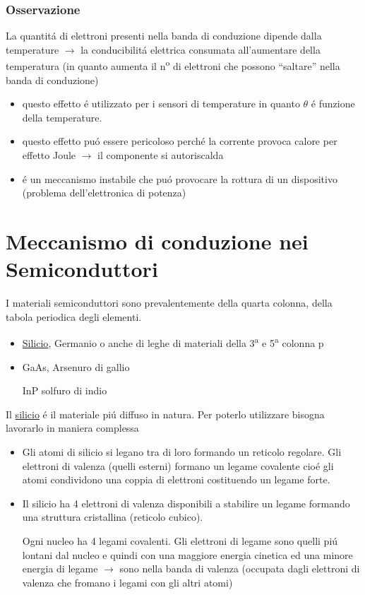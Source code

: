 \documentclass{article}
\begin{document}
\subsubsection{Osservazione}
La quantit\'a di elettroni presenti nella banda di conduzione dipende dalla temperature $\rightarrow$ la conducibilit\'a elettrica consumata all'aumentare della temperatura (in quanto aumenta il n\textsuperscript{o} di elettroni che possono ``saltare'' nella banda di conduzione)
\begin{itemize}
    \item questo effetto \'e utilizzato per i sensori di temperature in quanto $\theta$ \'e funzione della temperature.
    \item questo effetto pu\'o essere pericoloso perch\'e la corrente provoca calore per effetto Joule $\rightarrow$ il componente si autoriscalda
    \item \'e un meccanismo instabile che pu\'o provocare la rottura di un dispositivo (problema dell'elettronica di potenza)
\end{itemize}

\section{Meccanismo di conduzione nei Semiconduttori}
I materiali semiconduttori sono prevalentemente della quarta colonna, della tabola periodica degli elementi.

\begin{itemize}
    \item \underline{Silicio}, Germanio o anche di leghe di materiali della 3\textsuperscript{a} e 5\textsuperscript{a} colonna p
    \item GaAs, Arsenuro di gallio

        InP solfuro di indio
\end{itemize}

Il \underline{silicio} \'e il materiale pi\'u diffuso in natura. Per poterlo utilizzare bisogna lavorarlo in maniera complessa
\begin{itemize}

    \item Gli atomi di silicio si legano tra di loro formando un reticolo regolare. Gli elettroni di valenza (quelli esterni) formano un legame covalente cio\'e gli atomi condividono una coppia di elettroni costituendo un legame forte.
    \item Il silicio ha 4 elettroni di valenza disponibili a stabilire un legame formando una struttura cristallina (reticolo cubico).

        Ogni nucleo ha 4 legami covalenti. Gli elettroni di legame sono quelli pi\'u lontani dal nucleo e quindi con una maggiore energia cinetica ed una minore energia di legame $\rightarrow$ sono nella banda di valenza (occupata dagli elettroni di valenza che fromano i legami con gli altri atomi)
\end{itemize}
\end{document}
